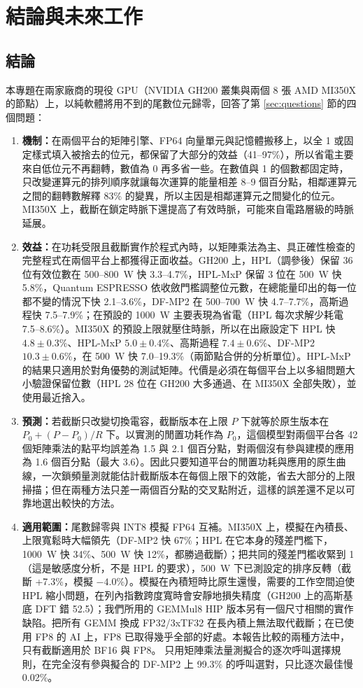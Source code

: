 \chapter{結論與未來工作}\label{ch:conclusion}

\section{結論}\label{sec:conclusion}

本專題在兩家廠商的現役 GPU（NVIDIA GH200 叢集與兩個 8 張 AMD MI350X 的節點）上，以純軟體將用不到的尾數位元歸零，回答了第 \ref{sec:questions} 節的四個問題：

\begin{enumerate}
  \item \textbf{機制：}在兩個平台的矩陣引擎、FP64 向量單元與記憶體搬移上，以全 1 或固定樣式填入被捨去的位元，都保留了大部分的效益（41–97\%），所以省電主要來自低位元不再翻轉，數值為 0 再多省一些。在數值與 1 的個數都固定時，只改變運算元的排列順序就讓每次運算的能量相差 8–9 個百分點，相鄰運算元之間的翻轉數解釋 83\% 的變異，所以主因是相鄰運算元之間變化的位元。MI350X 上，截斷在鎖定時脈下還提高了有效時脈，可能來自電路層級的時脈延展。
  \item \textbf{效益：}在功耗受限且截斷實作於程式內時，以矩陣乘法為主、具正確性檢查的完整程式在兩個平台上都獲得正面收益。GH200 上，HPL（調參後）保留 36 位有效位數在 500–800~W 快 3.3–4.7\%，HPL-MxP 保留 3 位在 500~W 快 5.8\%，Quantum ESPRESSO 依收斂門檻調整位元數，在總能量印出的每一位都不變的情況下快 2.1–3.6\%，DF-MP2 在 500–700~W 快 4.7–7.7\%，高斯過程快 7.5–7.9\%；在預設的 1000~W 主要表現為省電（HPL 每次求解少耗電 7.5–8.6\%）。MI350X 的預設上限就壓住時脈，所以在出廠設定下 HPL 快 $4.8\pm0.3$\%、HPL-MxP $5.0\pm0.4$\%、高斯過程 $7.4\pm0.6$\%、DF-MP2 $10.3\pm0.6$\%，在 500~W 快 7.0–19.3\%（兩節點合併的分析單位）。HPL-MxP 的結果只適用於對角優勢的測試矩陣。代價是必須在每個平台上以多組問題大小驗證保留位數（HPL 28 位在 GH200 大多通過、在 MI350X 全部失敗），並使用最近捨入。
  \item \textbf{預測：}若截斷只改變切換電容，截斷版本在上限 $P$ 下就等於原生版本在 $P_0+(P-P_0)/R$ 下。以實測的閒置功耗作為 $P_0$，這個模型對兩個平台各 42 個矩陣乘法的點平均誤差為 1.5 與 2.1 個百分點，對兩個沒有參與建模的應用為 1.6 個百分點（最大 3.6）。因此只要知道平台的閒置功耗與應用的原生曲線，一次鎖頻量測就能估計截斷版本在每個上限下的效能，省去大部分的上限掃描；但在兩種方法只差一兩個百分點的交叉點附近，這樣的誤差還不足以可靠地選出較快的方法。
  \item \textbf{適用範圍：}尾數歸零與 INT8 模擬 FP64 互補。MI350X 上，模擬在內積長、上限寬鬆時大幅領先（DF-MP2 快 67\%；HPL 在它本身的殘差門檻下，1000~W 快 34\%、500~W 快 12\%，都勝過截斷）；把共同的殘差門檻收緊到 1（這是敏感度分析，不是 HPL 的要求），500~W 下已測設定的排序反轉（截斷 +7.3\%，模擬 $-4.0$\%）。模擬在內積短時比原生還慢，需要的工作空間迫使 HPL 縮小問題，在列內指數跨度寬時會安靜地損失精度（GH200 上的高斯基底 DFT 錯 52.5\mEh）；我們所用的 GEMMul8 HIP 版本另有一個尺寸相關的實作缺陷。把所有 GEMM 換成 FP32/3xTF32 在長內積上無法取代截斷；在已使用 FP8 的 AI 上，FP8 已取得幾乎全部的好處。本報告比較的兩種方法中，只有截斷適用於 BF16 與 FP8。 只用矩陣乘法量測擬合的逐次呼叫選擇規則，在完全沒有參與擬合的 DF-MP2 上 99.3\% 的呼叫選對，只比逐次最佳慢 0.02\%。

\end{enumerate}
